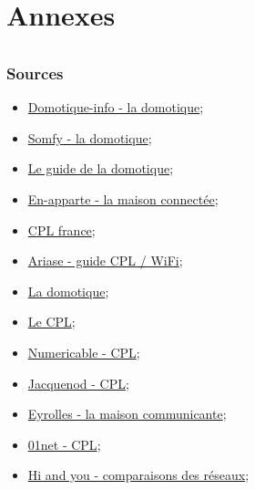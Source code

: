 
\part*{Annexes}
    \paragraph{}


    \section*{Sources}
        \begin{itemize}
            \item \href{http://www.domotique-info.fr/2012/02/installation-domotique-arnaud/}{Domotique-info - la domotique};
            \item \href{https://www.somfy.fr/produits/domotique/box-domotique}{Somfy - la domotique};
            \item \href{http://fr.slideshare.net/akelecedric/comprendre-choisir-leguidedeladomotique}{Le guide de la domotique};
            \item \href{http://www.en-apparte.fr/la-maison-connectee-des-equipements-pour-plus-de-confort-securite/}{En-apparte - la maison connectée};
            \item \href{http://www.cpl-france.org/}{CPL france};
            \item \href{http://www.ariase.com/fr/guides/cpl-wifi.html#tplink}{Ariase - guide CPL / WiFi};
            \item \href{http://toche.curie.free.fr/4emes/articles.php?pg=37&lng=fr}{La domotique};
            \item \href{http://cbras.free.fr/info/reseau.pdf}{Le CPL};
            \item \href{http://www.numericable.be/fr/television/materiel-tv/prise-cpl.aspx}{Numericable - CPL};
            \item \href{http://www.jacquenod.net/portail/Web/Cpl/DHTML/CII-cpl.htm}{Jacquenod - CPL};
            \item \href{http://www.eyrolles.com/Chapitres/9782212132762/Chap-1_Jeuland.pdf}{Eyrolles - la maison communicante};
            \item \href{http://www.01net.com/editorial/387087/et-si-vous-passiez-au-cpl/}{01net - CPL};
            \item \href{http://www.hi-and-you.fr/maison-connectee/confort/wifi-ethernet-prises-cpl-quels-sont-les-avantages-des-uns-et-des-autres-dans-la-maison}{Hi and you - comparaisons des réseaux};

\end{itemize}
